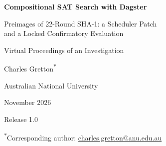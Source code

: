 \documentclass[11pt,a4paper]{article}
\begin{document}
\begin{titlepage}
\centering
\vspace*{3cm}
{\Huge\bfseries Compositional SAT Search with Dagster\par}
\vspace{0.6cm}
{\Large Preimages of 22-Round SHA-1: a Scheduler Patch\\and a Locked Confirmatory Evaluation\par}
\vspace{1.5cm}
{\Large Virtual Proceedings of an Investigation\par}
\vspace{2cm}
{\large Charles Gretton\textsuperscript{$\ast$}\par}
{\normalsize Australian National University\par}
\vspace{1cm}
{\normalsize November 2026\par}
{\small Release 1.0\par}
\vfill
{\small\textsuperscript{$\ast$}Corresponding author:
\href{mailto:charles.gretton@anu.edu.au}{charles.gretton@anu.edu.au}\par}
\end{titlepage}
\end{document}
